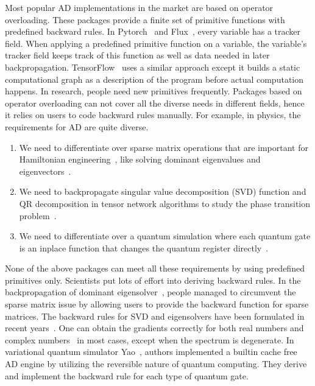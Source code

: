 \documentclass{article}
\newcommand{\<}{\langle}
\renewcommand{\>}{\rangle}
\theoremstyle{definition}\newtheorem{definition}{\textit{Definition}}
\begin{document}
    Most popular AD implementations in the market are based on operator overloading. These packages provide a finite set of primitive functions with predefined backward rules.
    In Pytorch~\cite{Paszke2017} and Flux~\cite{Innes2018a}, every variable has a tracker field. When applying a predefined primitive function on a variable, the variable's tracker field keeps track of this function as well as data needed in later backpropagation. TensorFlow~\cite{Tensorflow2015} uses a similar approach except it builds a static computational graph as a description of the program before actual computation happens.
    In research, people need new primitives frequently. Packages based on operator overloading can not cover all the diverse needs in different fields,
    hence it relies on users to code backward rules manually.
    For example, in physics, the requirements for AD are quite diverse.
    \begin{enumerate}
        \item We need to differentiate over sparse matrix operations that are important for Hamiltonian engineering~\cite{Xie2020}, like solving dominant eigenvalues and eigenvectors~\cite{Golub2012}.
        \item We need to backpropagate singular value decomposition (SVD) function and QR decomposition in tensor network algorithms to study the phase transition problem~\cite{Golub2012, Liao2019}.
        \item We need to differentiate over a quantum simulation where each quantum gate is an inplace function that changes the quantum register directly~\cite{Luo2019}.
    \end{enumerate}
    None of the above packages can meet all these requirements by using predefined primitives only.
    Scientists put lots of effort into deriving backward rules. In the backpropagation of dominant eigensolver~\cite{Xie2020}, people managed to circumvent the sparse matrix issue by allowing users to provide the backward function for sparse matrices.
    The backward rules for SVD and eigensolvers have been formulated in recent years~\cite{Seeger2017,Wan2019,Hubig2019}. One can obtain the gradients correctly for both real numbers and complex numbers~\cite{Wan2019} in most cases, except when the spectrum is degenerate.
    In variational quantum simulator Yao~\cite{Luo2019}, authors implemented a builtin cache free AD engine by utilizing the reversible nature of quantum computing. They derive and implement the backward rule for each type of quantum gate.
\end{document}
